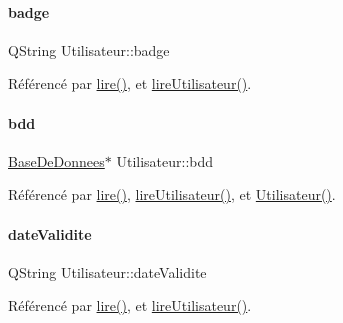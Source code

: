 \paragraph{\texorpdfstring{badge}{badge}}
{\footnotesize\ttfamily Q\+String Utilisateur\+::badge\hspace{0.3cm}{\ttfamily [private]}}



Référencé par \hyperlink{class_utilisateur_aa7d1a92ff4e06e9d302369f6c48884e1}{lire()}, et \hyperlink{class_utilisateur_a5911f84daf6d47d7f50e6d16022b292e}{lire\+Utilisateur()}.

\mbox{\label{class_utilisateur_a94fa14e95bd90358fb67eca0170e1724}} 
\paragraph{\texorpdfstring{bdd}{bdd}}
{\footnotesize\ttfamily \hyperlink{class_base_de_donnees}{Base\+De\+Donnees}$\ast$ Utilisateur\+::bdd\hspace{0.3cm}{\ttfamily [private]}}



Référencé par \hyperlink{class_utilisateur_aa7d1a92ff4e06e9d302369f6c48884e1}{lire()}, \hyperlink{class_utilisateur_a5911f84daf6d47d7f50e6d16022b292e}{lire\+Utilisateur()}, et \hyperlink{class_utilisateur_ae76433a6d353c5f5ad0c6a6af64022ad}{Utilisateur()}.

\mbox{\label{class_utilisateur_a898cd6f5a64d733ad49a8a74388326cd}} 
\paragraph{\texorpdfstring{date\+Validite}{dateValidite}}
{\footnotesize\ttfamily Q\+String Utilisateur\+::date\+Validite\hspace{0.3cm}{\ttfamily [private]}}



Référencé par \hyperlink{class_utilisateur_aa7d1a92ff4e06e9d302369f6c48884e1}{lire()}, et \hyperlink{class_utilisateur_a5911f84daf6d47d7f50e6d16022b292e}{lire\+Utilisateur()}.

\mbox{\label{class_utilisateur_a2f45443ce5277a5e6baefe5121e66555}} 
